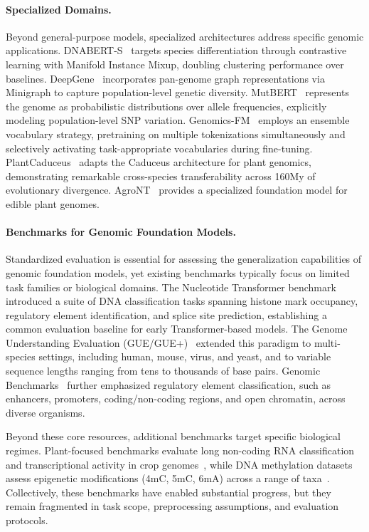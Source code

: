 \documentclass{article}
\theoremstyle{plain}
\theoremstyle{definition}
\theoremstyle{remark}
\begin{document}
\paragraph{Specialized Domains.}
Beyond general-purpose models, specialized architectures address specific genomic applications. DNABERT-S~\citep{zhou2024dnabertspioneeringspeciesdifferentiation} targets species differentiation through contrastive learning with Manifold Instance Mixup, doubling clustering performance over baselines. DeepGene~\citep{Zhang2024.04.24.590879} incorporates pan-genome graph representations via Minigraph to capture population-level genetic diversity. MutBERT~\citep{Long2025.01.23.634452} represents the genome as probabilistic distributions over allele frequencies, explicitly modeling population-level SNP variation. Genomics-FM~\citep{Ye2024.07.16.603653} employs an ensemble vocabulary strategy, pretraining on multiple tokenizations simultaneously and selectively activating task-appropriate vocabularies during fine-tuning. PlantCaduceus~\citep{doi:10.1073/pnas.2421738122} adapts the Caduceus architecture for plant genomics, demonstrating remarkable cross-species transferability across 160My of evolutionary divergence. AgroNT~\citep{mendoza2023foundational} provides a specialized foundation model for edible plant genomes.

\paragraph{Benchmarks for Genomic Foundation Models.}
Standardized evaluation is essential for assessing the generalization capabilities of genomic foundation models, yet existing benchmarks typically focus on limited task families or biological domains. The Nucleotide Transformer benchmark~\citep{dalla2023nucleotide} introduced a suite of DNA classification tasks spanning histone mark occupancy, regulatory element identification, and splice site prediction, establishing a common evaluation baseline for early Transformer-based models. The Genome Understanding Evaluation (GUE/GUE+)~\citep{zhou2024dnabert2efficientfoundationmodel} extended this paradigm to multi-species settings, including human, mouse, virus, and yeast, and to variable sequence lengths ranging from tens to thousands of base pairs. Genomic Benchmarks~\citep{Gresova2022.06.08.495248} further emphasized regulatory element classification, such as enhancers, promoters, coding/non-coding regions, and open chromatin, across diverse organisms.

Beyond these core resources, additional benchmarks target specific biological regimes. Plant-focused benchmarks evaluate long non-coding RNA classification and transcriptional activity in crop genomes~\citep{yang2025omnigenbenchmodularplatformreproducible}, while DNA methylation datasets assess epigenetic modifications (4mC, 5mC, 6mA) across a range of taxa~\citep{Feng2024.08.16.608288}. Collectively, these benchmarks have enabled substantial progress, but they remain fragmented in task scope, preprocessing assumptions, and evaluation protocols.
\end{document}
